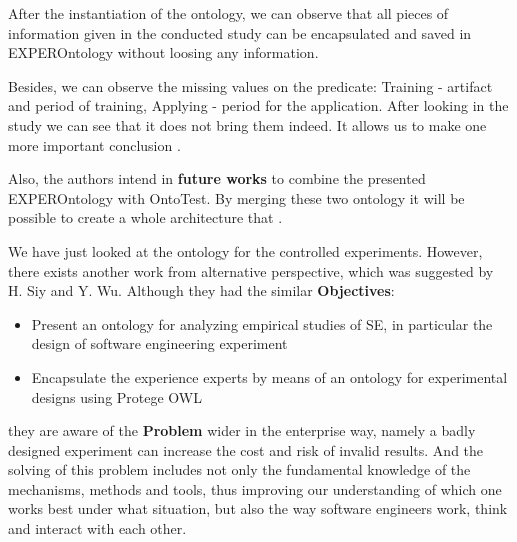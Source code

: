 	 After the instantiation of the ontology, we can observe that all pieces of information given in the conducted study can be encapsulated and saved in EXPEROntology without loosing any information.
	 
	 Besides, we can observe the missing values on the predicate: Training - artifact and period of training, Applying - period for the application. After looking in the study we can see that it does not bring them indeed. It allows us to make one more important conclusion \frqq\cite[p. 6]{Gar08}. 
	 
	 Also, the authors intend in \textbf{future works} to combine the presented EXPEROntology with OntoTest. By merging these two ontology it will be possible to create a whole architecture that \frqq\cite[p.6]{Gar08}.
	 
	 We have just looked at the ontology for the controlled experiments. However, there exists another work from alternative perspective, which was suggested by H. Siy and Y. Wu\cite{SiyWu12}. Although they had the similar \textbf{Objectives}:
	  \begin{itemize}
	 	\item Present an ontology for analyzing empirical studies of SE, in particular the design of software engineering experiment
	 	\item Encapsulate the experience experts by means of an ontology for experimental designs using Protege OWL
	 \end{itemize}
	they are aware of the \textbf{Problem} wider in the enterprise way, namely a badly designed experiment can increase the cost and risk of invalid results. And the solving of this problem includes not only the fundamental knowledge of the mechanisms, methods and tools, thus improving our understanding of which one works best under what situation, but also the way software engineers work, think and interact with each other.
	
